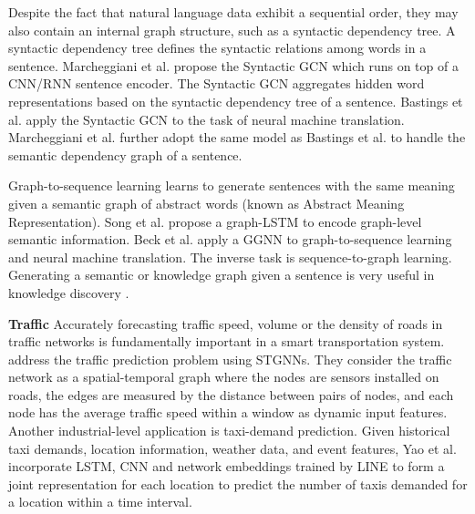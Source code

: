     
    
    Despite the fact that natural language data exhibit a sequential order,  they may also contain an internal graph structure, such as a syntactic dependency tree. A syntactic dependency tree defines the syntactic relations among words in a sentence. Marcheggiani et al. \cite{marcheggiani2017encoding} propose the Syntactic GCN which runs on top of a CNN/RNN sentence encoder. The Syntactic GCN aggregates hidden word representations based on the syntactic dependency tree of a sentence. Bastings et al.  \cite{bastings2017graph} apply the Syntactic GCN to the task of neural machine translation. Marcheggiani et al. \cite{marcheggiani2018exploiting} further adopt the same model as Bastings et al.  \cite{bastings2017graph} to handle the semantic dependency graph of a sentence. %
    
    
    Graph-to-sequence learning learns to generate sentences with the same meaning given a semantic graph of abstract words (known as Abstract Meaning Representation). Song et al. \cite{song2018graph} propose a graph-LSTM to encode graph-level semantic information. Beck et al.  \cite{beck2018graph} apply a GGNN \cite{li2015gated} to graph-to-sequence learning and neural machine translation.
    The inverse task is sequence-to-graph learning. Generating a semantic or knowledge graph given a sentence is very useful in knowledge discovery \cite{johnson2016learning,chen2018sequence}.
    
    
    
    \vspace{2mm}\noindent\textbf{Traffic} Accurately forecasting traffic speed, volume or the density of roads in traffic networks is fundamentally important in a smart transportation system.   \cite{zhang2018gaan,li2018diffusion,yuspatio} address the traffic prediction problem using STGNNs. They consider the traffic network as a spatial-temporal graph where the nodes are sensors installed on roads, the edges are measured by the distance between pairs of nodes, and each node has the average traffic speed within a window as dynamic input features.  Another industrial-level application is taxi-demand prediction. 
    Given historical taxi demands, location information, weather data, and event features,  Yao et al. \cite{yao2018deep} incorporate LSTM, CNN and network embeddings trained by LINE \cite{tang2015line} to form a joint representation for each location to predict the number of taxis demanded for a location within a time interval. 
    
